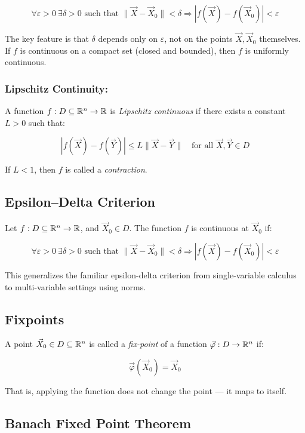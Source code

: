 \[
    \forall \varepsilon > 0 \ \exists \delta > 0 \text{ such that } \|\vec{X} - \vec{X}_0\| < \delta 
    \Rightarrow |f(\vec{X}) - f(\vec{X}_0)| < \varepsilon
\]

The key feature is that \( \delta \) depends only on \( \varepsilon \), not on the points 
\( \vec{X}, \vec{X}_0 \) themselves.  
If \(f\) is continuous on a compact set (closed and bounded), then \(f\) is uniformly continuous.

\subsubsection{Lipschitz Continuity:}  

A function \( f : D \subseteq \mathbb{R}^n \to \mathbb{R} \) is \emph{Lipschitz continuous} if there 
exists a constant \( L > 0 \) such that:

\[
    |f(\vec{X}) - f(\vec{Y})| \le L \|\vec{X} - \vec{Y}\| \quad \text{for all } \vec{X}, \vec{Y} \in D
\]

If \( L < 1 \), then \(f\) is called a \emph{contraction}.

\subsection{Epsilon–Delta Criterion}

Let \( f : D \subseteq \mathbb{R}^n \to \mathbb{R} \), and \( \vec{X}_0 \in D \). The function 
\(f\) is continuous at \( \vec{X}_0 \) if:

\[
    \forall \varepsilon > 0 \ \exists \delta > 0 \text{ such that } \|\vec{X} - \vec{X}_0\| 
    < \delta \Rightarrow |f(\vec{X}) - f(\vec{X}_0)| < \varepsilon
\]

This generalizes the familiar epsilon-delta criterion from single-variable calculus to multi-variable 
settings using norms.

\subsection{Fixpoints}
  
A point \( \vec{X}_0 \in D \subseteq \mathbb{R}^n \) is called a \emph{fix-point} of a function 
\( \vec{\varphi} : D \to \mathbb{R}^n \) if:

\[
    \vec{\varphi}(\vec{X}_0) = \vec{X}_0
\]

That is, applying the function does not change the point — it maps to itself.

\subsection{Banach Fixed Point Theorem}

